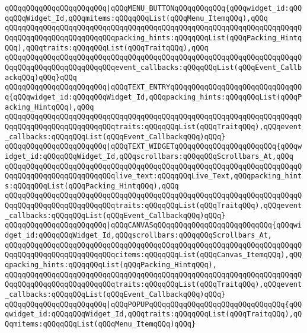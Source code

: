 \verb|qQQqqQQqqQQqqQQqqQQqqQQq|\verb#|qQQqMENU_BUTTONqQQqqQQqqQQq{qQQqwidget_id:qQQqqQQqWidget_Id,qQQqmitems:qQQqqQQqList(qQQqMenu_ItemqQQq),qQQq#\newline
\verb|qQQqqQQqqQQqqQQqqQQqqQQqqQQqqQQqqQQqqQQqqQQqqQQqqQQqqQQqqQQqqQQqqQQqqQQqqQQqqQQqqQQqqQQqqQQqqQQqpacking_hints:qQQqqQQqList(qQQqPacking_HintqQQq),qQQqtraits:qQQqqQQqList(qQQqTraitqQQq),qQQq|\newline
\verb|qQQqqQQqqQQqqQQqqQQqqQQqqQQqqQQqqQQqqQQqqQQqqQQqqQQqqQQqqQQqqQQqqQQqqQQqqQQqqQQqqQQqqQQqqQQqqQQqevent_callbacks:qQQqqQQqList(qQQqEvent_CallbackqQQq)qQQq}qQQq|\newline
\verb|qQQqqQQqqQQqqQQqqQQqqQQq|\verb#|qQQqTEXT_ENTRYqQQqqQQqqQQqqQQqqQQqqQQqqQQqqQQq{qQQqwidget_id:qQQqqQQqWidget_Id,qQQqpacking_hints:qQQqqQQqList(qQQqPacking_HintqQQq),qQQq#\newline
\verb|qQQqqQQqqQQqqQQqqQQqqQQqqQQqqQQqqQQqqQQqqQQqqQQqqQQqqQQqqQQqqQQqqQQqqQQqqQQqqQQqqQQqqQQqqQQqqQQqtraits:qQQqqQQqList(qQQqTraitqQQq),qQQqevent_callbacks:qQQqqQQqList(qQQqEvent_CallbackqQQq)qQQq}|\newline
\verb|qQQqqQQqqQQqqQQqqQQqqQQq|\verb#|qQQqTEXT_WIDGETqQQqqQQqqQQqqQQqqQQqqQQq{qQQqwidget_id:qQQqqQQqWidget_Id,qQQqscrollbars:qQQqqQQqScrollbars_At,qQQq#\newline
\verb|qQQqqQQqqQQqqQQqqQQqqQQqqQQqqQQqqQQqqQQqqQQqqQQqqQQqqQQqqQQqqQQqqQQqqQQqqQQqqQQqqQQqqQQqqQQqqQQqlive_text:qQQqqQQqLive_Text,qQQqpacking_hints:qQQqqQQqList(qQQqPacking_HintqQQq),qQQq|\newline
\verb|qQQqqQQqqQQqqQQqqQQqqQQqqQQqqQQqqQQqqQQqqQQqqQQqqQQqqQQqqQQqqQQqqQQqqQQqqQQqqQQqqQQqqQQqqQQqqQQqtraits:qQQqqQQqList(qQQqTraitqQQq),qQQqevent_callbacks:qQQqqQQqList(qQQqEvent_CallbackqQQq)qQQq}|\newline
\verb|qQQqqQQqqQQqqQQqqQQqqQQq|\verb#|qQQqCANVASqQQqqQQqqQQqqQQqqQQqqQQqqQQq{qQQqwidget_id:qQQqqQQqWidget_Id,qQQqscrollbars:qQQqqQQqScrollbars_At,#\newline
\verb|qQQqqQQqqQQqqQQqqQQqqQQqqQQqqQQqqQQqqQQqqQQqqQQqqQQqqQQqqQQqqQQqqQQqqQQqqQQqqQQqqQQqqQQqqQQqqQQqcitems:qQQqqQQqList(qQQqCanvas_ItemqQQq),qQQqpacking_hints:qQQqqQQqList(qQQqPacking_HintqQQq),|\newline
\verb|qQQqqQQqqQQqqQQqqQQqqQQqqQQqqQQqqQQqqQQqqQQqqQQqqQQqqQQqqQQqqQQqqQQqqQQqqQQqqQQqqQQqqQQqqQQqqQQqtraits:qQQqqQQqList(qQQqTraitqQQq),qQQqevent_callbacks:qQQqqQQqList(qQQqEvent_CallbackqQQq)qQQq}|\newline
\verb|qQQqqQQqqQQqqQQqqQQqqQQq|\verb#|qQQqPOPUPqQQqqQQqqQQqqQQqqQQqqQQqqQQqqQQq{qQQqwidget_id:qQQqqQQqWidget_Id,qQQqtraits:qQQqqQQqList(qQQqTraitqQQq),qQQqmitems:qQQqqQQqList(qQQqMenu_ItemqQQq)qQQq}#\newline
